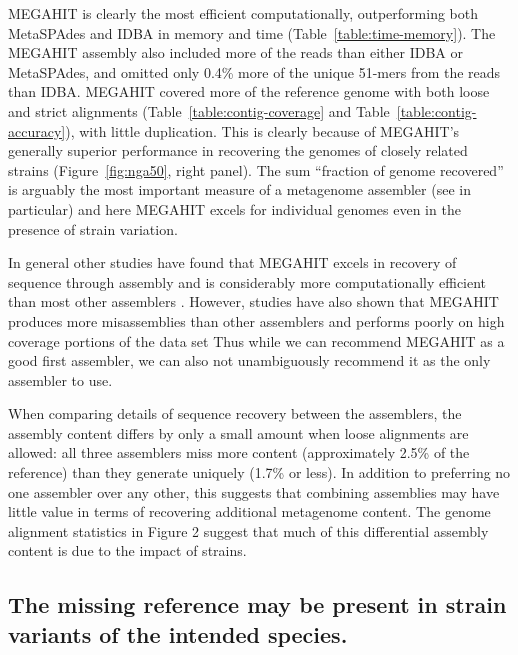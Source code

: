 \documentclass[11pt]{article}
\begin{document}
MEGAHIT is clearly the most efficient computationally, outperforming
both MetaSPAdes and IDBA in memory and time
(Table~\ref{table:time-memory}).  The MEGAHIT assembly also included
more of the reads than either IDBA or MetaSPAdes, and omitted only
0.4\% more of the unique 51-mers from the reads than IDBA.  MEGAHIT
covered more of the reference genome with both loose and strict
alignments (Table~\ref{table:contig-coverage} and
Table~\ref{table:contig-accuracy}), with little duplication.  This is
clearly because of MEGAHIT's generally superior performance in
recovering the genomes of closely related strains
(Figure~\ref{fig:nga50}, right panel).  The sum ``fraction of genome
recovered'' is arguably the most important measure of a metagenome
assembler (see \cite{Vollmers2017} in particular) and here MEGAHIT
excels for individual genomes even in the presence of strain
variation.

In general other studies have found that MEGAHIT excels in recovery of
sequence through assembly \cite{CAMI,Greenwald2017} and is
considerably more computationally efficient than most other assemblers
\cite{CAMI,metag_one}.  However, studies have also shown that MEGAHIT
produces more misassemblies than other assemblers \cite{CAMI} and
performs poorly on high coverage portions of the data set
\cite{Vollmers2017} Thus while we can recommend MEGAHIT as a good
first assembler, we can also not unambiguously recommend it as the only
assembler to use.


When comparing details of sequence recovery between the assemblers,
the assembly content differs by only a small amount when loose
alignments are allowed: all three assemblers miss more content
(approximately 2.5\% of the reference) than they generate uniquely
(1.7\% or less).  In addition to preferring no one assembler over any
other, this suggests that combining assemblies may have little value
in terms of recovering additional metagenome content.  The genome alignment
statistics in Figure 2 suggest that much of this differential assembly
content is due to the impact of strains.

\subsection*{The missing reference may be present in strain variants of the intended species.}
\end{document}
